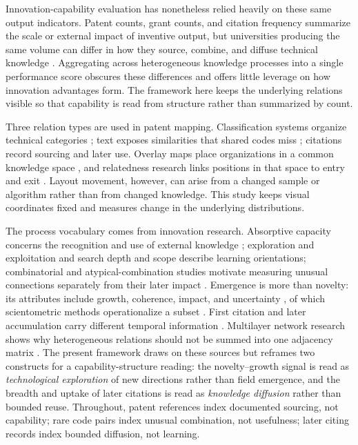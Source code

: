 Innovation-capability evaluation has nonetheless relied heavily on these same
output indicators. Patent counts, grant counts, and citation frequency summarize
the scale or external impact of inventive output, but universities producing
the same volume can differ in how they source, combine, and diffuse technical
knowledge \citep{griliches1990,hall2005}. Aggregating across heterogeneous
knowledge processes into a single performance score obscures these
differences and offers little leverage on how innovation advantages form. The
framework here keeps the underlying relations visible so that capability is
read from structure rather than summarized by count.

Three relation types are used in patent mapping. Classification systems
organize technical categories \citep{leydesdorff2008}; text exposes
similarities that shared codes miss \citep{whalen2020,kelly2021,sarica2020};
citations record sourcing and later use. Overlay maps place organizations in a
common knowledge space \citep{rafols2010,kay2014}, and relatedness research
links positions in that space to entry and exit \citep{kogler2013,rigby2015}.
Layout movement, however, can arise from a changed sample or algorithm rather
than from changed knowledge. This study keeps visual coordinates fixed and
measures change in the underlying distributions.

The process vocabulary comes from innovation research. Absorptive capacity
concerns the recognition and use of external knowledge \citep{cohen1990};
exploration and exploitation \citep{march1991} and search depth and scope
\citep{katila2002} describe learning orientations; combinatorial and
atypical-combination studies motivate measuring unusual connections separately
from their later impact \citep{fleming2001,uzzi2013,youn2015,verhoeven2016,wang2017}.
Emergence is more than novelty: its attributes include growth, coherence,
impact, and uncertainty \citep{rotolo2015}, of which scientometric methods
operationalize a subset \citep{small2014}. First citation and later accumulation
carry different temporal information \citep{huang2019}. Multilayer network
research shows why heterogeneous relations should not be summed into one
adjacency matrix \citep{kivela2014,boccaletti2014}. The present framework draws
on these sources but reframes two constructs for a capability-structure
reading: the novelty--growth signal is read as \emph{technological exploration}
of new directions rather than field emergence, and the breadth and uptake of
later citations is read as \emph{knowledge diffusion} rather than bounded
reuse. Throughout, patent references index documented sourcing, not
capability; rare code pairs index unusual combination, not usefulness; later
citing records index bounded diffusion, not learning.

